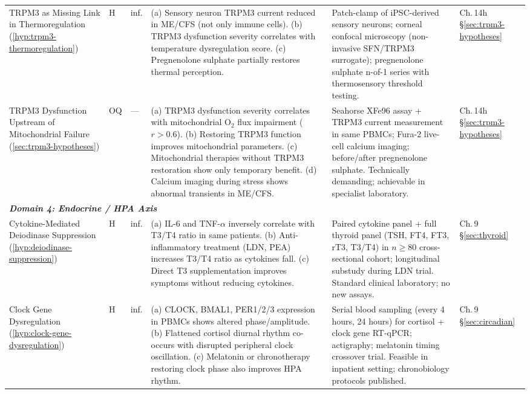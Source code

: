 \begin{longtable}{%
  p{3.0cm}
  >{\centering\arraybackslash}p{0.55cm}
  >{\centering\arraybackslash}p{1.0cm}
  p{3.8cm}
  p{3.8cm}
  p{2.2cm}
}
TRPM3 as Missing Link in Thermoregulation
(\ref{hyp:trpm3-thermoregulation})
&
H & inf.
&
(a) Sensory neuron TRPM3 current reduced in ME/CFS (not only immune cells).
(b) TRPM3 dysfunction severity correlates with temperature dysregulation score.
(c) Pregnenolone sulphate partially restores thermal perception.
&
Patch-clamp of iPSC-derived sensory neurons;
corneal confocal microscopy (non-invasive SFN/TRPM3 surrogate);
pregnenolone sulphate n-of-1 series with thermosensory threshold testing.
&
Ch.\,14h \S\ref{sec:trpm3-hypotheses} \\[6pt]

TRPM3 Dysfunction Upstream of Mitochondrial Failure
(\ref{sec:trpm3-hypotheses})
&
OQ & ---
&
(a) TRPM3 dysfunction severity correlates with mitochondrial O$_2$ flux
impairment ($r > 0.6$).
(b) Restoring TRPM3 function improves mitochondrial parameters.
(c) Mitochondrial therapies without TRPM3 restoration show only temporary benefit.
(d) Calcium imaging during stress shows abnormal transients in ME/CFS.
&
Seahorse XFe96 assay + TRPM3 current measurement in same PBMCs;
Fura-2 live-cell calcium imaging;
before/after pregnenolone sulphate.
Technically demanding; achievable in specialist laboratory.
&
Ch.\,14h \S\ref{sec:trpm3-hypotheses} \\[6pt]

\multicolumn{6}{l}{\small\textit{\textbf{Domain 4: Endocrine / HPA Axis}}} \\[2pt]

Cytokine-Mediated Deiodinase Suppression
(\ref{hyp:deiodinase-suppression})
&
H & inf.
&
(a) IL-6 and TNF-$\alpha$ inversely correlate with T3/T4 ratio in same patients.
(b) Anti-inflammatory treatment (LDN, PEA) increases T3/T4 ratio as cytokines fall.
(c) Direct T3 supplementation improves symptoms without reducing cytokines.
&
Paired cytokine panel + full thyroid panel (TSH, FT4, FT3, rT3, T3/T4) in
$n \geq 80$ cross-sectional cohort; longitudinal substudy during LDN trial.
Standard clinical laboratory; no new assays.
&
Ch.\,9 \S\ref{sec:thyroid} \\[6pt]

Clock Gene Dysregulation
(\ref{hyp:clock-gene-dysregulation})
&
H & inf.
&
(a) CLOCK, BMAL1, PER1/2/3 expression in PBMCs shows altered phase/amplitude.
(b) Flattened cortisol diurnal rhythm co-occurs with disrupted peripheral clock
oscillation.
(c) Melatonin or chronotherapy restoring clock phase also improves HPA rhythm.
&
Serial blood sampling (every 4 hours, 24 hours) for cortisol + clock gene
RT-qPCR; actigraphy; melatonin timing crossover trial.
Feasible in inpatient setting; chronobiology protocols published.
&
Ch.\,9 \S\ref{sec:circadian} \\[6pt]


\end{longtable}
